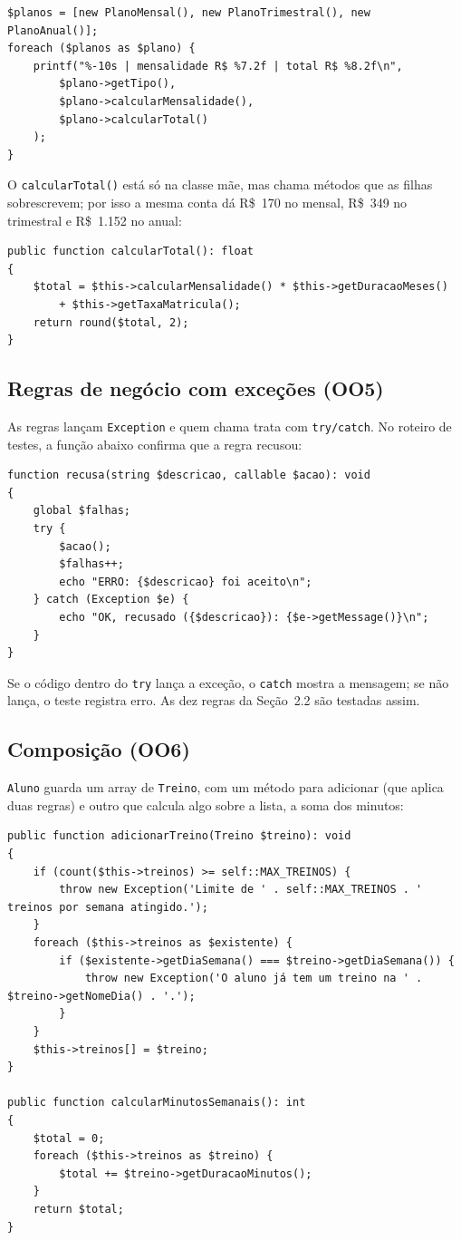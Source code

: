 \documentclass[12pt,a4paper]{article}
\begin{document}
\begin{lstlisting}
$planos = [new PlanoMensal(), new PlanoTrimestral(), new PlanoAnual()];
foreach ($planos as $plano) {
    printf("%-10s | mensalidade R$ %7.2f | total R$ %8.2f\n",
        $plano->getTipo(),
        $plano->calcularMensalidade(),
        $plano->calcularTotal()
    );
}
\end{lstlisting}

O \texttt{calcularTotal()} está só na classe mãe, mas chama métodos que as filhas sobrescrevem; por isso a mesma conta dá R\$~170 no mensal, R\$~349 no trimestral e R\$~1.152 no anual:

\begin{lstlisting}
public function calcularTotal(): float
{
    $total = $this->calcularMensalidade() * $this->getDuracaoMeses()
        + $this->getTaxaMatricula();
    return round($total, 2);
}
\end{lstlisting}

\subsection{Regras de negócio com exceções (OO5)}

As regras lançam \texttt{Exception} e quem chama trata com \texttt{try/catch}. No roteiro de testes, a função abaixo confirma que a regra recusou:

\begin{lstlisting}
function recusa(string $descricao, callable $acao): void
{
    global $falhas;
    try {
        $acao();
        $falhas++;
        echo "ERRO: {$descricao} foi aceito\n";
    } catch (Exception $e) {
        echo "OK, recusado ({$descricao}): {$e->getMessage()}\n";
    }
}
\end{lstlisting}

Se o código dentro do \texttt{try} lança a exceção, o \texttt{catch} mostra a mensagem; se não lança, o teste registra erro. As dez regras da Seção~2.2 são testadas assim.

\subsection{Composição (OO6)}

\texttt{Aluno} guarda um array de \texttt{Treino}, com um método para adicionar (que aplica duas regras) e outro que calcula algo sobre a lista, a soma dos minutos:

\begin{lstlisting}
public function adicionarTreino(Treino $treino): void
{
    if (count($this->treinos) >= self::MAX_TREINOS) {
        throw new Exception('Limite de ' . self::MAX_TREINOS . ' treinos por semana atingido.');
    }
    foreach ($this->treinos as $existente) {
        if ($existente->getDiaSemana() === $treino->getDiaSemana()) {
            throw new Exception('O aluno já tem um treino na ' . $treino->getNomeDia() . '.');
        }
    }
    $this->treinos[] = $treino;
}

public function calcularMinutosSemanais(): int
{
    $total = 0;
    foreach ($this->treinos as $treino) {
        $total += $treino->getDuracaoMinutos();
    }
    return $total;
}
\end{lstlisting}
\end{document}
